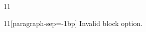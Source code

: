 \documentclass[paper=A4]{ropas-poster}
\begin{document}
\begin{postergrid}{1}{1}
\begin{posterblock}{1}{1}[paragraph-sep=-1bp]
Invalid block option.
\end{posterblock}
\end{postergrid}
\end{document}
